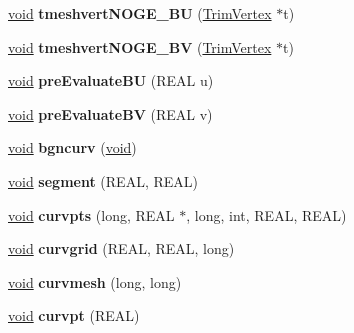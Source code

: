 \begin{DoxyCompactItemize}
\item 
\mbox{\label{class_backend_a684a695a3918df6ef1d5d0ea252e9e3e}} 
\hyperlink{interfacevoid}{void} {\bfseries tmeshvert\+N\+O\+G\+E\+\_\+\+BU} (\hyperlink{class_trim_vertex}{Trim\+Vertex} $\ast$t)
\item 
\mbox{\label{class_backend_a1ee2eb84a2a8fc59f12ca24b2eda0f07}} 
\hyperlink{interfacevoid}{void} {\bfseries tmeshvert\+N\+O\+G\+E\+\_\+\+BV} (\hyperlink{class_trim_vertex}{Trim\+Vertex} $\ast$t)
\item 
\mbox{\label{class_backend_ac21a9440540a4a237b474b500300bf7b}} 
\hyperlink{interfacevoid}{void} {\bfseries pre\+Evaluate\+BU} (R\+E\+AL u)
\item 
\mbox{\label{class_backend_ac3ccb220b306481b5df9c149db6dfd15}} 
\hyperlink{interfacevoid}{void} {\bfseries pre\+Evaluate\+BV} (R\+E\+AL v)
\item 
\mbox{\label{class_backend_ae7134e88f2573cda00bd41c4106361f0}} 
\hyperlink{interfacevoid}{void} {\bfseries bgncurv} (\hyperlink{interfacevoid}{void})
\item 
\mbox{\label{class_backend_ae70a13fcd75763da7fb8b97fead0ff71}} 
\hyperlink{interfacevoid}{void} {\bfseries segment} (R\+E\+AL, R\+E\+AL)
\item 
\mbox{\label{class_backend_a6225f628a61906bd4705d6ef1a4e71a1}} 
\hyperlink{interfacevoid}{void} {\bfseries curvpts} (long, R\+E\+AL $\ast$, long, int, R\+E\+AL, R\+E\+AL)
\item 
\mbox{\label{class_backend_a586e908a0c19e2c87da6838f12514c18}} 
\hyperlink{interfacevoid}{void} {\bfseries curvgrid} (R\+E\+AL, R\+E\+AL, long)
\item 
\mbox{\label{class_backend_a3582f77182e73a3922e6dc1de3002448}} 
\hyperlink{interfacevoid}{void} {\bfseries curvmesh} (long, long)
\item 
\mbox{\label{class_backend_abffb6f1b85b3125a1d07cc651b37889a}} 
\hyperlink{interfacevoid}{void} {\bfseries curvpt} (R\+E\+AL)

\end{DoxyCompactItemize}
